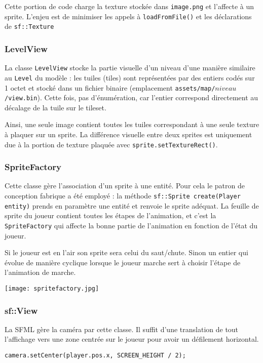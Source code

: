 \documentclass[a4paper,11pt]{article}
\begin{document}
Cette portion de code charge la texture stockée dans \texttt{image.png} et l'affecte à un sprite.
L'enjeu est de minimiser les appels à \texttt{loadFromFile()} et les déclarations de \texttt{sf::Texture}

\subsubsection*{LevelView}
La classe \texttt{LevelView} stocke la partie visuelle d'un niveau d'une manière similaire au \texttt{Level} du modèle : les tuiles (tiles) sont représentées par des entiers codés sur 1 octet et stocké dans un fichier binaire (emplacement \texttt{assets/map/$niveau$/view.bin}). Cette fois, pas d'énumération, car l'entier correspond directement au décalage de la tuile sur le tileset.


\begin{center}
\end{center}

Ainsi, une seule image contient toutes les tuiles correspondant à une seule texture à plaquer sur un sprite. La différence visuelle entre deux sprites est uniquement due à la portion de texture plaquée avec \texttt{sprite.setTextureRect()}.

\subsubsection*{SpriteFactory}
Cette classe gère l'association d'un sprite à une entité. Pour cela le patron de conception fabrique a été employé : la méthode \texttt{sf::Sprite create(Player entity)} prends en paramètre une entité et renvoie le sprite adéquat. La feuille de sprite du joueur contient toutes les étapes de l'animation, et c'est la \texttt{SpriteFactory} qui affecte la bonne partie de l'animation en fonction de l'état du joueur.

Si le joueur est en l'air son sprite sera celui du saut/chute. Sinon un entier qui évolue de manière cyclique lorsque le joueur marche sert à choisir l'étape de l'animation de marche.

\vspace{0.7cm}
\begin{center}
\texttt{[image: spritefactory.jpg]}
\end{center}
\vspace{1cm}

\subsubsection*{sf::View}
La SFML gère la caméra par cette classe. Il suffit d'une translation de tout l'affichage vers une zone centrée sur le joueur pour avoir un défilement horizontal.
\begin{lstlisting}
camera.setCenter(player.pos.x, SCREEN_HEIGHT / 2);
\end{lstlisting}
\end{document}
